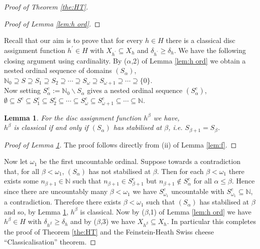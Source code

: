 \documentclass{strippedproc-l}
\newtheorem{lemma}[theorem]{Lemma}
\theoremstyle{definition}
\theoremstyle{remark}
\numberwithin{equation}{section}
\begin{document}
\begin{proof}[Proof of Theorem \ref{the:HT}]
\begin{proof}[Proof of Lemma \ref{lem:h ord}]
\end{proof}
Recall that our aim is to prove that for every $h\in H$ there is a classical disc assignment function $h^{'}\in H$ with $X_{h^{'}}\subseteq X_{h}$ and $\delta_{h^{'}}\ge\delta_{h}$. We have the following closing argument using cardinality. By ($\alpha$,2) of Lemma \ref{lem:h ord} we obtain a nested ordinal sequence of domains $(S_{\alpha})$,\\
$\mathbb{N}_{0}\supseteq S\supseteq S_{1}\supseteq S_{2}\supseteq\cdots\supseteq S_{\omega}\supseteq S_{\omega+1}\supseteq\cdots\supseteq\{0\}$.\\
Now setting $S_{\alpha}^{c}:=\mathbb{N}_{0}\backslash S_{\alpha}$ gives a nested ordinal sequence $(S_{\alpha}^{c})$,\\
$\emptyset\subseteq S^{c}\subseteq S_{1}^{c}\subseteq S_{2}^{c}\subseteq\cdots\subseteq S_{\omega}^{c}\subseteq S_{\omega+1}^{c}\subseteq\cdots\subseteq\mathbb{N}$. 
\begin{lemma}
For the disc assignment function $h^{\beta}$ we have,\\
$h^{\beta}$ is classical if and only if $(S_{\alpha})$ has stabilised at $\beta$, i.e. $S_{\beta+1}=S_{\beta}$.
\label{lem:stab}
\end{lemma}
\begin{proof}[Proof of Lemma \ref{lem:stab}]
The proof follows directly from (ii) of Lemma \ref{lem:f}.
\end{proof}
Now let $\omega_{1}$ be the first uncountable ordinal. Suppose towards a contradiction that, for all $\beta<\omega_{1}$, $(S_{\alpha})$ has not stabilised at $\beta$. Then for each $\beta<\omega_{1}$ there exists some $n_{\beta+1}\in\mathbb{N}$ such that $n_{\beta+1}\in S_{\beta+1}^{c}$ but $n_{\beta+1}\not\in S_{\alpha}^{c}$ for all $\alpha\le\beta$. Hence since there are uncountably many $\beta<\omega_{1}$ we have $S_{\omega_{1}}^{c}$ uncountable with $S_{\omega_{1}}^{c}\subseteq\mathbb{N}$, a contradiction. Therefore there exists $\beta<\omega_{1}$ such that $(S_{\alpha})$ has stabilised at $\beta$ and so, by Lemma \ref{lem:stab}, $h^{\beta}$ is classical. Now by ($\beta$,1) of Lemma \ref{lem:h ord} we have $h^{\beta}\in H$ with $\delta_{h^{\beta}}\geq\delta_{h}$ and by ($\beta$,3) we have $X_{h^{\beta}}\subseteq X_{h}$. In particular this completes the proof of Theorem \ref{the:HT} and the Feinstein-Heath Swiss cheese ``Classicalisation'' theorem.
\end{proof}
\end{document}
